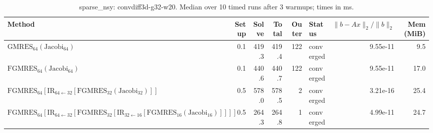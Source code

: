 \begin{table}[t]
\centering
\small
\caption{sparse_nsy: convdiff3d-g32-w20. Median over 10 timed runs after 3 warmups; times in ms.}
\label{tab:sparse_nsy-convdiff3d-g32-w20}
\begin{tabular}{lrrrrlrr}
\hline
Method & Setup & Solve & Total & Outer & Status & $\|b-Ax\|_2/\|b\|_2$ & Mem (MiB) \\
\hline
$\mathrm{GMRES}_{64}(\mathrm{Jacobi}_{64})$ & 0.1 & 419.3 & 419.4 & 122 & converged & 9.55e-11 & 9.5 \\
$\mathrm{FGMRES}_{64}(\mathrm{Jacobi}_{64})$ & 0.1 & 440.6 & 440.7 & 122 & converged & 9.55e-11 & 17.0 \\
$\mathrm{FGMRES}_{64}[\mathrm{IR}_{64\leftarrow 32}[\mathrm{FGMRES}_{32}(\mathrm{Jacobi}_{32})]]$ & 0.5 & 578.0 & 578.5 & 2 & converged & 3.21e-16 & 25.4 \\
$\mathrm{FGMRES}_{64}[\mathrm{IR}_{64\leftarrow 32}[\mathrm{FGMRES}_{32}[\mathrm{IR}_{32\leftarrow 16}[\mathrm{FGMRES}_{16}(\mathrm{Jacobi}_{16})]]]]$ & 0.5 & 264.3 & 264.8 & 1 & converged & 4.99e-11 & 24.7 \\
\hline
\end{tabular}
\end{table}

